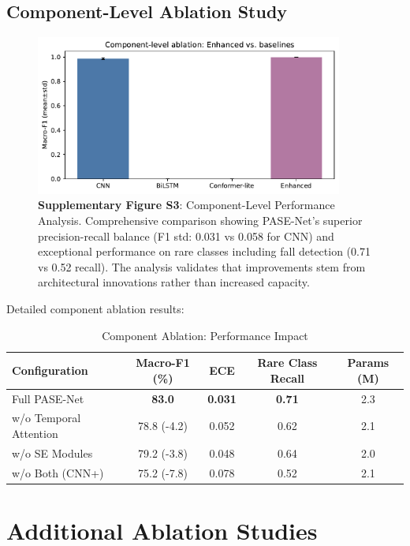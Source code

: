 \documentclass[10pt,a4paper]{article}
\begin{document}
\subsection{Component-Level Ablation Study}

\begin{figure}[h!]
\centering
\includegraphics[width=0.9\textwidth]{plots/ablation_components.pdf}
\caption{\textbf{Supplementary Figure S3}: Component-Level Performance Analysis. Comprehensive comparison showing PASE-Net's superior precision-recall balance (F1 std: 0.031 vs 0.058 for CNN) and exceptional performance on rare classes including fall detection (0.71 vs 0.52 recall). The analysis validates that improvements stem from architectural innovations rather than increased capacity.}
\label{fig:supp_component_analysis}
\end{figure}

Detailed component ablation results:

\begin{table}[h!]
\centering
\caption{Component Ablation: Performance Impact}
\begin{tabular}{lcccc}
\toprule
\textbf{Configuration} & \textbf{Macro-F1 (\%)} & \textbf{ECE} & \textbf{Rare Class Recall} & \textbf{Params (M)} \\
\midrule
Full PASE-Net & \textbf{83.0} & \textbf{0.031} & \textbf{0.71} & 2.3 \\
w/o Temporal Attention & 78.8 (-4.2) & 0.052 & 0.62 & 2.1 \\
w/o SE Modules & 79.2 (-3.8) & 0.048 & 0.64 & 2.0 \\
w/o Both (CNN+) & 75.2 (-7.8) & 0.078 & 0.52 & 2.1 \\
\bottomrule
\end{tabular}
\end{table}

\section{Additional Ablation Studies}
\end{document}
